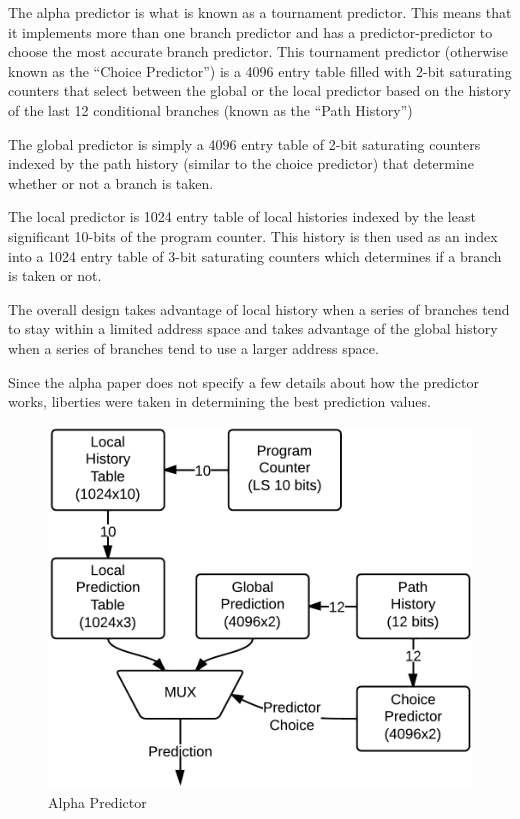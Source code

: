 \documentclass[twocolumn]{article}
\newcommand{\centerimage}[3]{
\begin{figure}[ht!]  
\begin{center} #1
\caption{#2}
\label{#3}
\end{center}
\end{figure}}
\begin{document}
 The alpha predictor is what is known as a tournament predictor.  This
 means that it implements more than one branch predictor and has a
 predictor-predictor to choose the most accurate branch
 predictor. This tournament predictor (otherwise known as the ``Choice
 Predictor'') is a 4096 entry table filled with 2-bit saturating
 counters that select between the global or the local predictor based
 on the history of the last 12 conditional branches (known as the
 ``Path History'')

 The global predictor is simply a 4096 entry table of 2-bit saturating
 counters indexed by the path history (similar to the choice
 predictor) that determine whether or not a branch is taken.

 The local predictor is 1024 entry table of local histories indexed by
 the least significant 10-bits of the program counter. This history is
 then used as an index into a 1024 entry table of 3-bit saturating
 counters which determines if a branch is taken or not.

 The overall design takes advantage of local history when a series of
 branches tend to stay within a limited address space and takes
 advantage of the global history when a series of branches tend to use
 a larger address space.

 Since the alpha paper does not specify a few details about how the
 predictor works, liberties were taken in determining the best
 prediction values.

\centerimage{\includegraphics[width=\columnwidth]{AlphaPredictor.png}}{Alpha
  Predictor}{Alpha}
\end{document}
